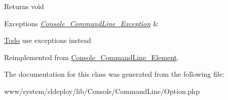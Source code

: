 \begin{DoxyReturn}{Returns}
void 
\end{DoxyReturn}

\begin{DoxyExceptions}{Exceptions}
{\em \hyperlink{class_console___command_line___exception}{Console\_\-CommandLine\_\-Exception}} & \\
\hline
\end{DoxyExceptions}
\begin{Desc}
\item[\hyperlink{todo__todo000005}{Todo}]use exceptions instead \end{Desc}


Reimplemented from \hyperlink{class_console___command_line___element_a184909dab34698899937d810a9f5d393}{Console\_\-CommandLine\_\-Element}.



The documentation for this class was generated from the following file:\begin{DoxyCompactItemize}
\item 
www/system/sldeploy/lib/Console/CommandLine/Option.php\end{DoxyCompactItemize}

